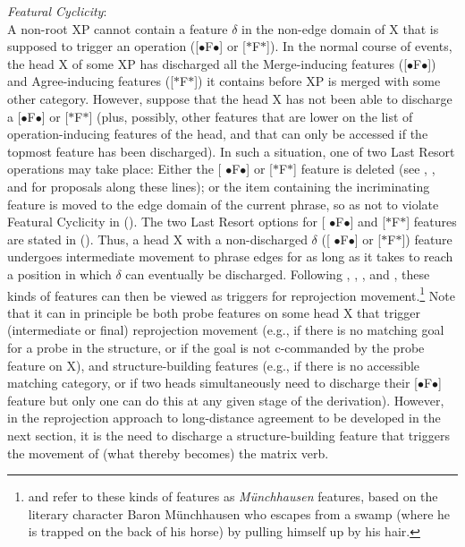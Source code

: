 \documentclass[output=paper
,modfonts
,nonflat]{langsci/langscibook}
\begin{document}
	\ea\label{ex:mueller:27} {\itshape Featural \label{fc}Cyclicity}:\\
	A non-root XP cannot contain a feature $\delta$ in the non-edge domain of X that is supposed to trigger an operation ([{\small $\bullet$}F{\small $\bullet$}] or [$*$F$*$]).\z
	In the normal course of events, the head X of some XP has discharged
	all the Merge-inducing features ([{\small $\bullet$}F{\small $\bullet$}])
	and Agree-inducing features ([$*$F$*$]) it contains before XP is merged with some
	other category. However, suppose that the head X has not been able to
	discharge a [{\small $\bullet$}F{\small $\bullet$}] or [$*$F$*$]
	(plus, possibly, other features that are lower on the list of
	operation-inducing features of the head, and that can only be accessed
	if the topmost feature has been discharged). In such a situation, one
	of two Last Resort operations may take place: Either the [{\small
		$\bullet$}F{\small $\bullet$}] or [$*$F$*$] feature is deleted (see 
	\citealt{BejarRezac:09},
	\citealt{Preminger:14}, and  \citealt{Georgi:14} for proposals along these
	lines); or the item containing the incriminating feature is moved to the edge domain of
	the current phrase, so as not to violate Featural Cyclicity
	in (\Last). The two Last Resort options for [{\small
		$\bullet$}F{\small $\bullet$}] and [$*$F$*$] features are stated
	in (\Next). 
	Thus, a head X with a non-discharged $\delta$ ([{\small
		$\bullet$}F{\small $\bullet$}] or [$*$F$*$]) feature undergoes
	intermediate movement to phrase edges for as long as it takes to reach
	a position in which $\delta$ can eventually be discharged. Following
	\citet{Fanselow:03,Fanselow:09:boo}, \citet{Suranyi:05},
	\citet{Matushansky:06}, and \citet{GeorgiMueller:10:rep}, these kinds
	of features can then be viewed as triggers for reprojection
	movement.\footnote{\citet{Fanselow:03,Fanselow:09:boo} and
		\citet{GeorgiMueller:10:rep} refer to these kinds of features as
		{\itshape M\"unchhausen} features, based on the literary character
		Baron M\"unchhausen who escapes from a swamp (where he is
		trapped on the back of his horse) by pulling himself up by his
		hair.} Note that it can in principle be both probe features on
	some head X that trigger (intermediate or final) reprojection movement
	(e.g., if there is no matching goal for a probe in the structure, or
	if the goal is not c-commanded by the probe feature on X), and
	structure-building features (e.g., if there is no accessible matching
	category, or if two heads simultaneously need to discharge their
	[{\small $\bullet$}F{\small $\bullet$}] feature but only one can do
	this at any given stage of the derivation). However, in the
	reprojection approach to long-distance agreement to be developed in
	the next section, it is the need to discharge a structure-building
	feature that triggers the movement of (what thereby becomes) the
	matrix verb.
	
\end{document}
